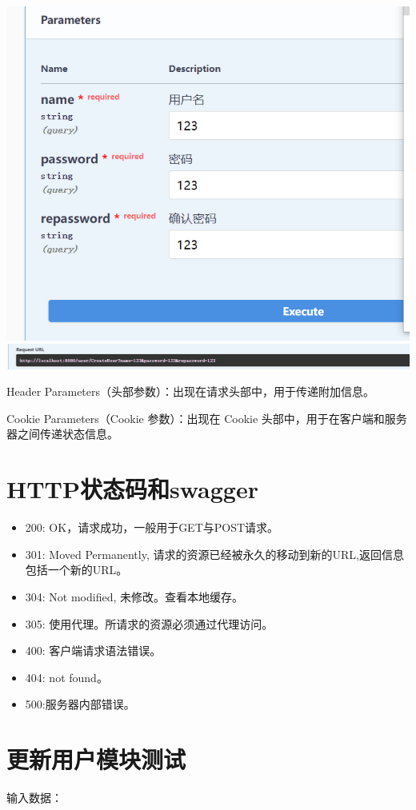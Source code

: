 \documentclass[12pt]{article}
\begin{document}
	\includegraphics{1.png}
	\includegraphics{2.png}
	
	Header Parameters（头部参数）：出现在请求头部中，用于传递附加信息。
	
	Cookie Parameters（Cookie 参数）：出现在 Cookie 头部中，用于在客户端和服务器之间传递状态信息。
	
	\section{HTTP状态码和swagger}
	\begin{itemize}
		\item 200: OK，请求成功，一般用于GET与POST请求。
		\item 301: Moved Permanently, 请求的资源已经被永久的移动到新的URL,返回信息包括一个新的URL。
		\item 304: Not modified, 未修改。查看本地缓存。
		\item 305: 使用代理。所请求的资源必须通过代理访问。
		\item 400: 客户端请求语法错误。
		\item 404: not found。
		\item 500:服务器内部错误。
	\end{itemize}
	
	\section{更新用户模块测试}
	输入数据：
	
\end{document}
